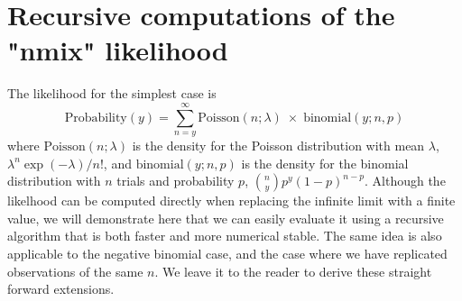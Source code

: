 \documentclass[article]{jss}
\begin{document}
\appendix
\section{Recursive computations of the "nmix" likelihood}
The likelihood for the simplest case is
\begin{displaymath}
    \text{Probability}(y) = \sum_{n = y}^{\infty}
    \text{Poisson}(n ; \lambda) \;\times\; \text{binomial}(y;  n, p)
\end{displaymath}
where $\text{Poisson}(n; \lambda)$ is the density for the Poisson distribution with mean $\lambda$, $\lambda^{n}\exp(-\lambda)/n!$, and $\text{binomial}(y; n, p)$ is the density for the binomial distribution with $n$ trials and probability $p$, ${n \choose y} p^{y}(1-p)^{n-p}$. Although the likelhood can be computed directly when replacing the infinite limit with a finite value, we will demonstrate here that we can easily evaluate it using a recursive algorithm that is both faster and more numerical stable. The same idea is also applicable to the negative binomial case, and the case where we have replicated observations of the same $n$. We leave it to the reader to derive these straight forward extensions.
\end{document}
